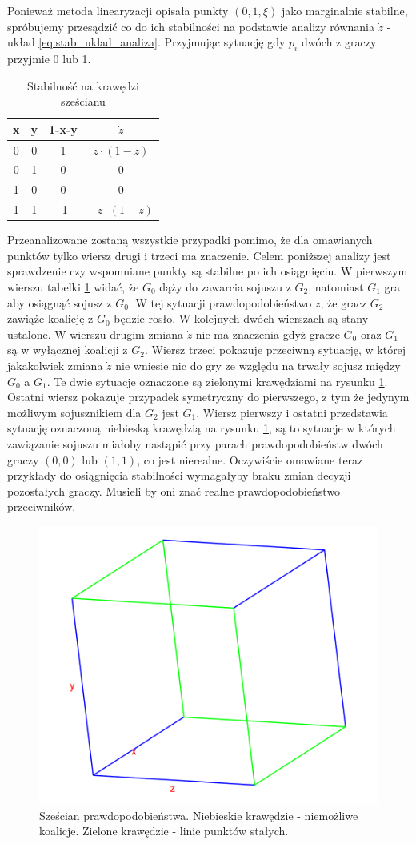 Ponieważ metoda linearyzacji opisała punkty $(0,1,\xi)$ jako marginalnie stabilne, spróbujemy przesądzić co do ich stabilności na podstawie analizy równania $\dot{z}$ - układ \ref{eq:stab_uklad_analiza}. Przyjmując sytuację gdy $p_i$ dwóch z graczy przyjmie 0 lub 1. 
\begin{table}
    \centering
    \caption{Stabilność na krawędzi sześcianu}
\label{tab:krawedz_prawd}
\begin{tabular}{c|c|c|c}
x & y & 1-x-y & $\dot{z}$       \\ \hline 
0 & 0 & 1     & $z \cdot (1-z)$  \\
0 & 1 & 0     & 0                \\
1 & 0 & 0     & 0                \\
1 & 1 & -1    & $-z \cdot (1-z)$
\end{tabular}
\end{table}
Przeanalizowane zostaną wszystkie przypadki pomimo, że dla omawianych punktów tylko wiersz drugi i trzeci ma znaczenie. Celem poniższej analizy jest sprawdzenie czy wspomniane punkty są stabilne po ich osiągnięciu.
W pierwszym wierszu tabelki \ref{tab:krawedz_prawd} widać, że $G_0$ dąży do zawarcia sojuszu z $G_2$, natomiast $G_1$ gra aby osiągnąć sojusz z $G_0$. W tej sytuacji prawdopodobieństwo $z$, że gracz $G_2$ zawiąże koalicję z $G_0$ będzie rosło. W kolejnych dwóch wierszach są stany ustalone. W wierszu drugim zmiana $\dot{z}$ nie ma znaczenia gdyż gracze $G_0$ oraz $G_1$ są w wyłącznej koalicji z $G_2$. Wiersz trzeci pokazuje przeciwną sytuację, w której jakakolwiek zmiana $\dot{z}$ nie wniesie nic do gry ze względu na trwały sojusz między $G_0$ a $G_1$. Te dwie sytuacje oznaczone są zielonymi krawędziami na rysunku \ref{fig:szescian}. Ostatni wiersz pokazuje przypadek symetryczny do pierwszego, z tym że jedynym możliwym sojusznikiem dla $G_2$ jest $G_1$. Wiersz pierwszy i ostatni przedstawia sytuację oznaczoną niebieską krawędzią na rysunku \ref{fig:szescian}, są to sytuacje w których zawiązanie sojuszu miałoby nastąpić przy parach prawdopodobieństw dwóch graczy $(0,0)$ lub $(1,1)$, co jest nierealne. Oczywiście omawiane teraz przykłady do osiągnięcia stabilności wymagałyby braku zmian decyzji pozostałych graczy. Musieli by oni znać realne prawdopodobieństwo przeciwników.
\begin{figure}[h]
	\centering
	\includegraphics[width=.5\textwidth]{pict/wyniki/szescian.png}	
	\caption{Sześcian prawdopodobieństwa. Niebieskie krawędzie - niemożliwe koalicje. Zielone krawędzie - linie punktów stałych.} \label{fig:szescian}
\end{figure}